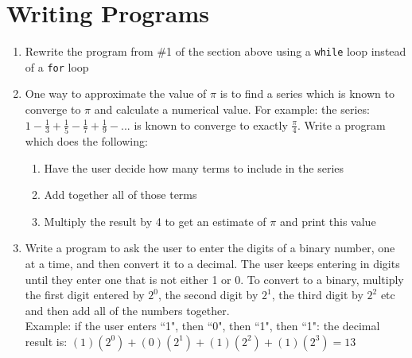\documentclass{article}
\begin{document}
\section*{Writing Programs}
\begin{enumerate}
\item Rewrite the program from \#1 of the section above using a \texttt{while} loop instead of a \texttt{for} loop
\item One way to approximate the value of $\pi$ is to find a series which is known to converge to $\pi$ and calculate a numerical value. For example: the series: $1-\frac{1}{3}+\frac{1}{5}-\frac{1}{7}+\frac{1}{9}-...$ is known to converge to exactly $\frac{\pi}{4}$. Write a program which does the following:
\begin{enumerate}
	\item Have the user decide how many terms to include in the series
	\item Add together all of those terms
	\item Multiply the result by 4 to get an estimate of $\pi$ and print this value
\end{enumerate}
\item Write a program to ask the user to enter the digits of a binary number, one at a time, and then convert it to a decimal. The user keeps entering in digits until they enter one that is not either 1 or 0. To convert to a binary, multiply the first digit entered by $2^0$, the second digit by $2^1$, the third digit by $2^2$ etc and then add all of the numbers together.\\ Example: if the user enters ``1", then ``0", then ``1", then ``1": the decimal result is: $(1)(2^0) + (0)(2^1) + (1)(2^2) + (1)(2^3) = 13$
\end{enumerate}
\end{document}
